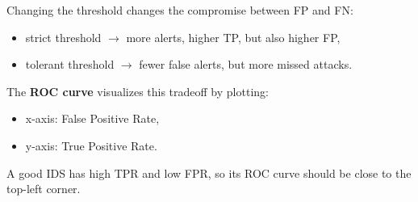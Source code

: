 Changing the threshold changes the compromise between FP and FN:
\begin{itemize}
    \item strict threshold $\rightarrow$ more alerts, higher TP, but also higher FP,
    \item tolerant threshold $\rightarrow$ fewer false alerts, but more missed attacks.
\end{itemize}

The \textbf{ROC curve} visualizes this tradeoff by plotting:
\begin{itemize}
    \item x-axis: False Positive Rate,
    \item y-axis: True Positive Rate.
\end{itemize}

A good IDS has high TPR and low FPR, so its ROC curve should be close to the top-left corner. 
